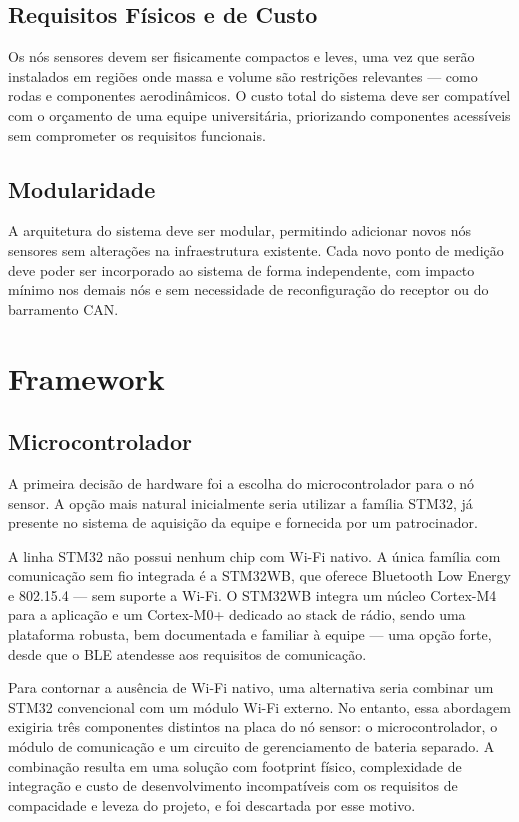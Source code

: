 \documentclass{article}
\begin{document}
    \subsection{Requisitos Físicos e de Custo}

    Os nós sensores devem ser fisicamente compactos e leves, uma vez que serão
    instalados em regiões onde massa e volume são restrições relevantes — como
    rodas e componentes aerodinâmicos. O custo total do sistema deve ser compatível
    com o orçamento de uma equipe universitária, priorizando componentes
    acessíveis sem comprometer os requisitos funcionais.

    \subsection{Modularidade}

    A arquitetura do sistema deve ser modular, permitindo adicionar novos nós
    sensores sem alterações na infraestrutura existente. Cada novo ponto de medição
    deve poder ser incorporado ao sistema de forma independente, com impacto
    mínimo nos demais nós e sem necessidade de reconfiguração do receptor ou do
    barramento CAN.

    \section{Framework}
    \subsection{Microcontrolador}

    A primeira decisão de hardware foi a escolha do microcontrolador para o nó sensor.
    A opção mais natural inicialmente seria utilizar a família STM32, já presente
    no sistema de aquisição da equipe e fornecida por um patrocinador. %

    A linha STM32 não possui nenhum chip com Wi-Fi nativo. A única família com comunicação
    sem fio integrada é a STM32WB, que oferece Bluetooth Low Energy e 802.15.4 —
    sem suporte a Wi-Fi. O STM32WB integra um núcleo Cortex-M4 para a aplicação
    e um Cortex-M0+ dedicado ao stack de rádio, sendo uma plataforma robusta, bem
    documentada e familiar à equipe — uma opção forte, desde que o BLE atendesse
    aos requisitos de comunicação.

    Para contornar a ausência de Wi-Fi nativo, uma alternativa seria combinar um
    STM32 convencional com um módulo Wi-Fi externo. No entanto, essa abordagem exigiria
    três componentes distintos na placa do nó sensor: o microcontrolador, o módulo
    de comunicação e um circuito de gerenciamento de bateria separado. A
    combinação resulta em uma solução com footprint físico, complexidade de integração
    e custo de desenvolvimento incompatíveis com os requisitos de compacidade e leveza
    do projeto, e foi descartada por esse motivo.
\end{document}

